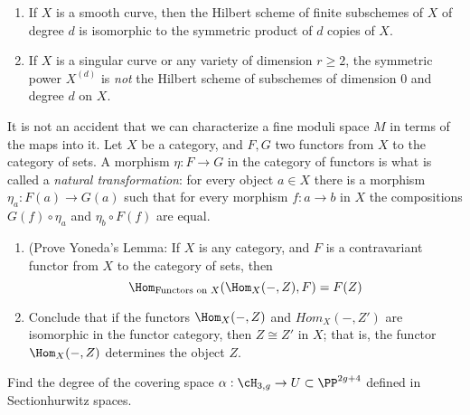 
\begin{exercise}\label{symmetric power vs Hilbert scheme}
\begin{enumerate}
 \item If $X$ is a smooth curve, then the Hilbert scheme of finite subschemes of $X$ of degree $d$ is
 isomorphic to the symmetric product of $d$ copies of $X$.
 \item If $X$ is a singular curve or any variety of dimension $r \geq 2$, the symmetric power $X^{(d)}$ is \emph{not} the Hilbert scheme of subschemes of dimension 0 and degree $d$ on $X$. 
 
\end{enumerate}
 \end{exercise}

\begin{exercise}
It is not an accident that we can characterize a fine moduli space $M$ in terms of the maps into it. 
 Let $X$ be a category, and $F,G$ two functors from $X$ to the category of sets.
 A morphism $\eta: F\to G$ in the category of functors is what is called a \emph{natural transformation}:
 for every object $a\in X$ there is a morphism $\eta_a:F(a) \to G(a)$ such that for every
 morphism $f: a\to b$ in $X$ the compositions $G(f)\circ \eta_a$ and $\eta_b\circ F(f)$
 are equal. 
\begin{enumerate}
 \item (Prove Yoneda's Lemma: If $X$ is any category, and $F$ is a contravariant functor from $X$ to the category of sets, then 
 $$
 \Hom_{\hbox{\scriptsize Functors on $X$}}(\Hom_X( -, Z), F) = F(Z)
 $$
 \item Conclude that if the functors $\Hom_X( -, Z)$ and $Hom_X( -, Z')$ are isomorphic in the functor category, 
 then $Z \cong Z'$ in $X$; that is, the functor $\Hom_X( -, Z)$ determines the object $Z$.
 \end{enumerate}
\end{exercise}



\begin{exercise}
Find the degree of the covering space $\alpha : \cH_{3,g} \to U \subset \PP^{2g+4}$
defined in Section{hurwitz spaces}.
\end{exercise}

